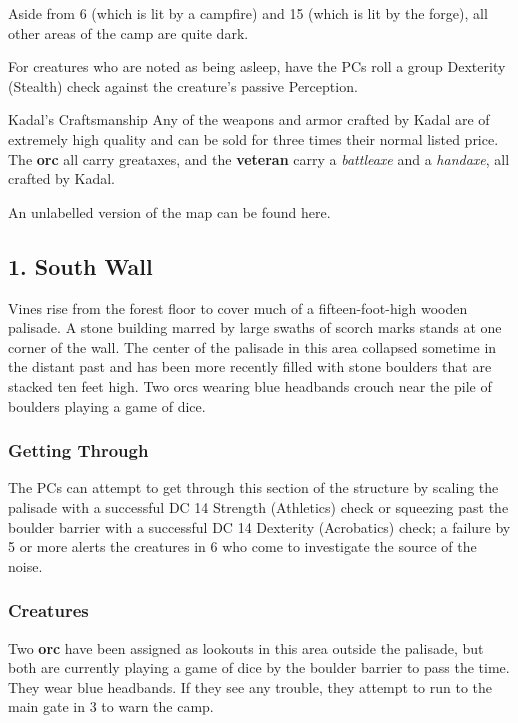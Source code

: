 \documentclass[10pt,a4paper,twoside,bg=print,twocolumn,openany,nodeprecatedcode]{dndbook}
\begin{document}
Aside from 6 (which is lit by a campfire) and 15 (which is lit by the forge), all other areas of the camp are quite dark.

For creatures who are noted as being asleep, have the PCs roll a group Dexterity (Stealth) check against the creature's passive Perception.

\begin{DndSidebar}[float=!b]{Kadal's Craftsmanship}
Any of the weapons and armor crafted by Kadal are of extremely high quality and can be sold for three times their normal listed price. The \textbf{orc} all carry greataxes, and the \textbf{veteran} carry a \textit{battleaxe} and a \textit{handaxe}, all crafted by Kadal.



\end{DndSidebar}

An unlabelled version of the map can be found here.

\subsection{1. South Wall}
\begin{DndReadAloud}{}
Vines rise from the forest floor to cover much of a fifteen-foot-high wooden palisade. A stone building marred by large swaths of scorch marks stands at one corner of the wall. The center of the palisade in this area collapsed sometime in the distant past and has been more recently filled with stone boulders that are stacked ten feet high. Two orcs wearing blue headbands crouch near the pile of boulders playing a game of dice.

\end{DndReadAloud}

\subsubsection{Getting Through}
The PCs can attempt to get through this section of the structure by scaling the palisade with a successful DC 14 Strength (Athletics) check or squeezing past the boulder barrier with a successful DC 14 Dexterity (Acrobatics) check; a failure by 5 or more alerts the creatures in 6 who come to investigate the source of the noise.

\subsubsection{Creatures}
Two \textbf{orc} have been assigned as lookouts in this area outside the palisade, but both are currently playing a game of dice by the boulder barrier to pass the time. They wear blue headbands. If they see any trouble, they attempt to run to the main gate in 3 to warn the camp.
\end{document}
